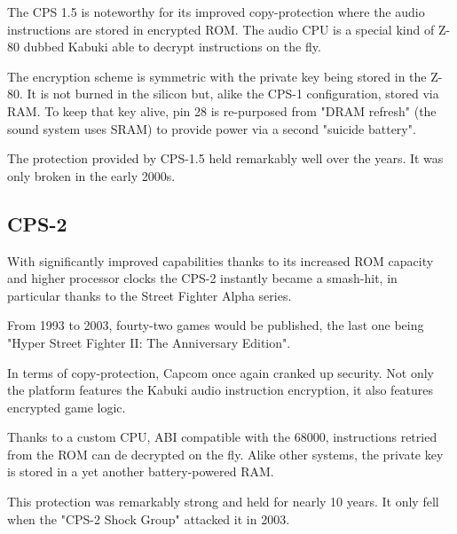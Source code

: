 The CPS 1.5 is noteworthy for its improved copy-protection where the audio instructions are stored in encrypted ROM. The audio CPU is a special kind of Z-80 dubbed Kabuki\cite{arcadeHackerKabuki} able to decrypt instructions on the fly.

The encryption scheme is symmetric with the private key being stored in the Z-80. It is not burned in the silicon but, alike the CPS-1 configuration, stored via RAM. To keep that key alive, pin 28 is re-purposed from "DRAM refresh" (the sound system uses SRAM) to provide power via a second "suicide battery". 

\begin{trivia}
The protection provided by CPS-1.5 held remarkably well over the years. It was only broken in the early 2000s\cite{ame_kabuki}.
\end{trivia}

\subsection{CPS-2}

With significantly improved capabilities thanks to its increased ROM capacity and higher processor clocks the CPS-2 instantly became a smash-hit, in particular thanks to the Street Fighter Alpha series. 

From 1993 to 2003, fourty-two games would be published, the last one being "Hyper Street Fighter II: The Anniversary Edition".

In terms of copy-protection, Capcom once again cranked up security. Not only the platform features the Kabuki audio instruction encryption, it also features encrypted game logic. 

Thanks to a custom CPU, ABI compatible with the 68000, instructions retried from the ROM can de decrypted on the fly. Alike other systems, the private key is stored in a yet another battery-powered RAM.

\begin{trivia}
This protection was remarkably strong and held for nearly 10 years. It only fell when the "CPS-2 Shock Group" attacked it in 2003\cite{cps2rebirth}.
\end{trivia}



